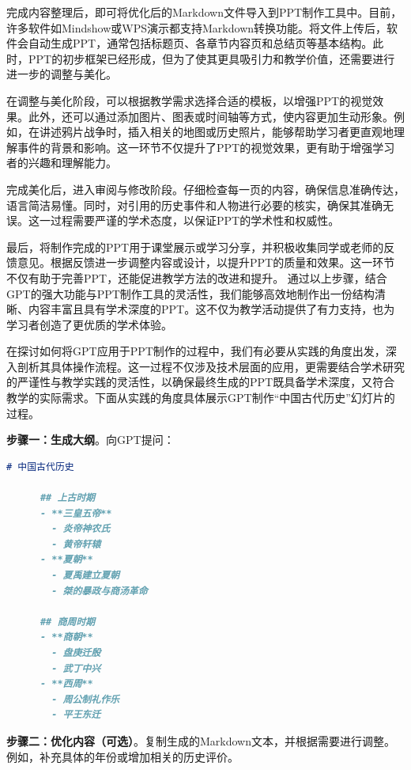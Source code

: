 完成内容整理后，即可将优化后的Markdown文件导入到PPT制作工具中。目前，许多软件如Mindshow或WPS演示都支持Markdown转换功能。将文件上传后，软件会自动生成PPT，通常包括标题页、各章节内容页和总结页等基本结构。此时，PPT的初步框架已经形成，但为了使其更具吸引力和教学价值，还需要进行进一步的调整与美化。

在调整与美化阶段，可以根据教学需求选择合适的模板，以增强PPT的视觉效果。此外，还可以通过添加图片、图表或时间轴等方式，使内容更加生动形象。例如，在讲述鸦片战争时，插入相关的地图或历史照片，能够帮助学习者更直观地理解事件的背景和影响。这一环节不仅提升了PPT的视觉效果，更有助于增强学习者的兴趣和理解能力。

完成美化后，进入审阅与修改阶段。仔细检查每一页的内容，确保信息准确传达，语言简洁易懂。同时，对引用的历史事件和人物进行必要的核实，确保其准确无误。这一过程需要严谨的学术态度，以保证PPT的学术性和权威性。

最后，将制作完成的PPT用于课堂展示或学习分享，并积极收集同学或老师的反馈意见。根据反馈进一步调整内容或设计，以提升PPT的质量和效果。这一环节不仅有助于完善PPT，还能促进教学方法的改进和提升。
通过以上步骤，结合GPT的强大功能与PPT制作工具的灵活性，我们能够高效地制作出一份结构清晰、内容丰富且具有学术深度的PPT。这不仅为教学活动提供了有力支持，也为学习者创造了更优质的学术体验。

在探讨如何将GPT应用于PPT制作的过程中，我们有必要从实践的角度出发，深入剖析其具体操作流程。这一过程不仅涉及技术层面的应用，更需要结合学术研究的严谨性与教学实践的灵活性，以确保最终生成的PPT既具备学术深度，又符合教学的实际需求。下面从实践的角度具体展示GPT制作``中国古代历史''幻灯片的过程。

\textbf{步骤一：生成大纲}。向GPT提问：


\begin{gptbox}
\small{
\begin{lstlisting}[language=Markdown]
      # 中国古代历史
      
      ## 上古时期
      - **三皇五帝**
        - 炎帝神农氏
        - 黄帝轩辕
      - **夏朝**
        - 夏禹建立夏朝
        - 桀的暴政与商汤革命
      
      ## 商周时期
      - **商朝**
        - 盘庚迁殷
        - 武丁中兴
      - **西周**
        - 周公制礼作乐
        - 平王东迁
\end{lstlisting}
}
\end{gptbox}


\textbf{步骤二：优化内容（可选）}。复制生成的Markdown文本，并根据需要进行调整。例如，补充具体的年份或增加相关的历史评价。


